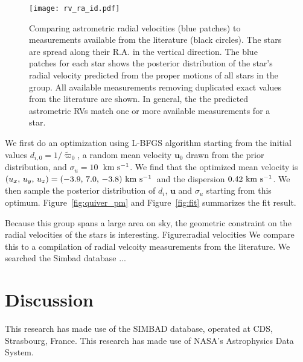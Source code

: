 \documentclass[modern,letterpaper]{aastex61}
\newcommand{\figname}{Figure}
\newcommand{\bs}[1]{\boldsymbol{#1}}
\renewcommand{\vec}[1]{\bs{#1}}
\newcommand{\kms}{\ensuremath{\rm km~s^{-1}}}
\newcommand{\todo}[1]{{\color{crimson}#1}}
\newcommand{\meanVelocityOpt}{\ensuremath{(u_x,\,u_y,\,u_z) = (-3.9,\,7.0,\,-3.8)~\kms}}
\newcommand{\sigVelocityOpt}{\ensuremath{0.42~\kms}}
\begin{document}
\begin{figure}
  \centering
  \texttt{[image: rv\_ra\_id.pdf]}
  \caption{
    Comparing astrometric radial velocities (blue patches) to
    measurements available from the literature (black circles).
    The stars are spread along their R.A. in the vertical direction.
    The blue patches for each star shows the posterior distribution
    of the star's radial velocity predicted from the proper motions of
    all stars in the group.
    All available measurements removing duplicated exact values from
    the literature are shown.
    In general, the the predicted astrometric RVs match one or more
    available measurements for a star.
  }
  \label{fig:rv_ra_id}
\end{figure}

We first do an optimization using L-BFGS algorithm starting from the
initial values $d_{i,0} = 1/{\tilde \varpi_0}$, a random mean velocity $\vec{u}_0$
drawn from the prior distribution, and $\sigma_u=10$~\kms.
We find that the optimized mean velocity is \meanVelocityOpt\ and the dispersion \sigVelocityOpt.
We then sample the posterior distribution of $d_i$, $\vec{u}$ and $\sigma_u$ starting
from this optimum.
\figname~\ref{fig:quiver_pm} and \figname~\ref{fig:fit} summarizes
the fit result.


Because this group spans a large area on sky,
the geometric constraint on the radial velocities of the stars is interesting.
\todo{Figure:radial velocities}
We compare this to a compilation of radial velcoity measurements from the literature.
We searched the Simbad database ...





\section{Discussion}
\label{sec:discussion}

% 



\acknowledgements
This research has made use of the SIMBAD database,
operated at CDS, Strasbourg, France.
This research has made use of NASA's Astrophysics Data System.



\end{document}
